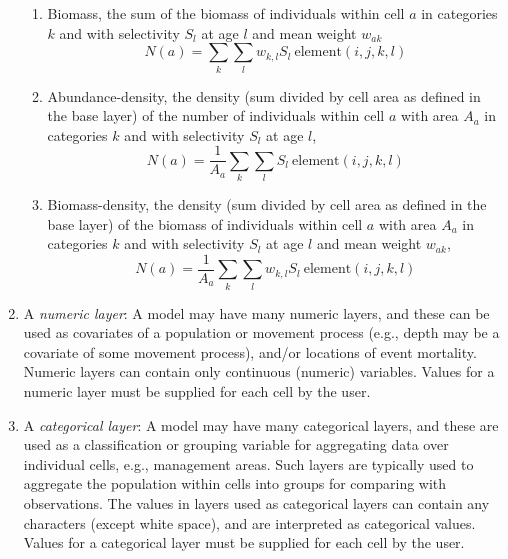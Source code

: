 \begin{enumerate}
\begin{enumerate}
\item Biomass, the sum of the biomass of individuals within cell $a$ in categories $k$ and with selectivity $S_l$ at age $l$ and mean weight $w_{ak}$
\begin{equation}
  N(a) = \sum\limits_{k} \sum\limits_l w_{k,l} S_l \ \text{element}(i,j,k,l) 
\end{equation}

\item Abundance-density, the density (sum divided by cell area as defined in the base layer) of the number of individuals within cell $a$ with area $A_a$ in categories $k$ and with selectivity $S_l$ at age $l$,
\begin{equation}
  N(a) = \frac{1}{A_a} \sum\limits_{k} \sum\limits_l S_l \ \text{element}(i,j,k,l)
\end{equation}

\item Biomass-density, the density (sum divided by cell area as defined in the base layer) of the biomass of individuals within cell $a$ with area $A_a$ in categories $k$ and with selectivity $S_l$ at age $l$ and mean weight $w_{ak}$,
\begin{equation}
  N(a) = \frac{1}{A_a} \sum\limits_{k} \sum\limits_l w_{k,l} S_l \ \text{element}(i,j,k,l)
\end{equation}
\end{enumerate}

\item A \emph{numeric layer}: A model may have many numeric layers, and these can be used as covariates of a population or movement process (e.g., depth may be a covariate of some movement process), and/or locations of event mortality. Numeric layers can contain only continuous (numeric) variables. Values for a numeric layer must be supplied for each cell by the user.

\item A \emph{categorical layer}: A model may have many categorical layers, and these are used as a classification or grouping variable for aggregating data over individual cells, e.g., management areas. Such layers are typically used to aggregate the population within cells into groups for comparing with observations. The values in layers used as categorical layers can contain any characters (except white space), and are interpreted as categorical values. Values for a categorical layer must be supplied for each cell by the user.


\end{enumerate}
